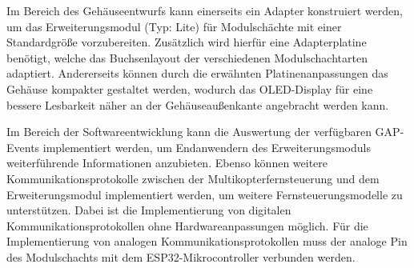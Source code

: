 Im Bereich des Gehäuseentwurfs kann einerseits ein Adapter konstruiert werden, um das Erweiterungsmodul (Typ: Lite) für Modulschächte mit einer Standardgröße vorzubereiten. Zusätzlich wird hierfür eine Adapterplatine benötigt, welche das Buchsenlayout der verschiedenen Modulschachtarten adaptiert. Andererseits können durch die erwähnten Platinenanpassungen das Gehäuse kompakter gestaltet werden, wodurch das \acs{OLED}-Display für eine bessere Lesbarkeit näher an der Gehäuseaußenkante angebracht werden kann.

Im Bereich der Softwareentwicklung kann die Auswertung der verfügbaren \ac{GAP}-Events implementiert werden, um Endanwendern des Erweiterungsmoduls weiterführende Informationen anzubieten. Ebenso können weitere Kommunikationsprotokolle zwischen der Multikopterfernsteuerung und dem Erweiterungsmodul implementiert werden, um weitere Fernsteuerungsmodelle zu unterstützen. Dabei ist die Implementierung von digitalen Kommunikationsprotokollen ohne Hardwareanpassungen möglich. Für die Implementierung von analogen Kommunikationsprotokollen muss der analoge Pin des Modulschachts mit dem ESP32-Mikrocontroller verbunden werden.